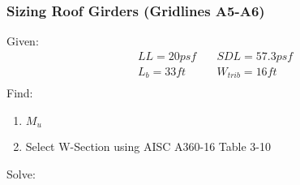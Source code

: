 \documentclass{report} %
\begin{document}
\subsubsection*{Sizing Roof Girders (Gridlines A5-A6)}
Given:
\begin{equation*}
    \begin{aligned}
        &LL = 20psf \quad &SDL = 57.3psf \\
        &L_b = 33ft \quad &W_{trib} = 16ft \\
    \end{aligned}
\end{equation*}
Find:
\begin{enumerate}
    \item $M_u$
    \item Select W-Section using AISC A360-16 Table 3-10
\end{enumerate}
Solve:
\end{document}
